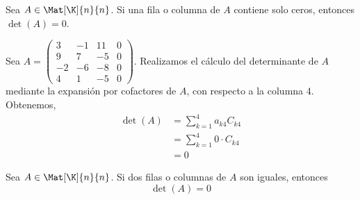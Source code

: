 \documentclass[compacto,10pt]{pubciencias-notas}
\begin{document}
\begin{prop}
    Sea $A \in \Mat[\K]{n}{n}$. Si una fila o columna de $A$ contiene solo ceros, entonces $\det (A) =0$.
\end{prop}

\begin{ejem}
    Sea $A =
    \begin{pmatrix}
        3 & -1 & 11 & 0 \\
        9 & 7 & -5 & 0 \\
        -2 & -6 & -8 & 0 \\
        4 & 1 & -5 & 0
    \end{pmatrix}$. Realizamos el cálculo del determinante de $A$ mediante la expansión por cofactores de $A$, con respecto a la columna $4$. Obtenemos,
    \begin{align*}
        \det(A) &= \sum_{k=1}^{4} a_{k4} C_{k4}\\
                &= \sum_{k=1}^{4} 0\cdot C_{k4}\\
                &= 0
    \end{align*}
    
\end{ejem}

\begin{prop}
    Sea $A \in \Mat[\K]{n}{n}$. Si dos filas o columnas de $A$ son iguales, entonces 
    \[
        \det(A) = 0
    \]
\end{prop}
\end{document}
